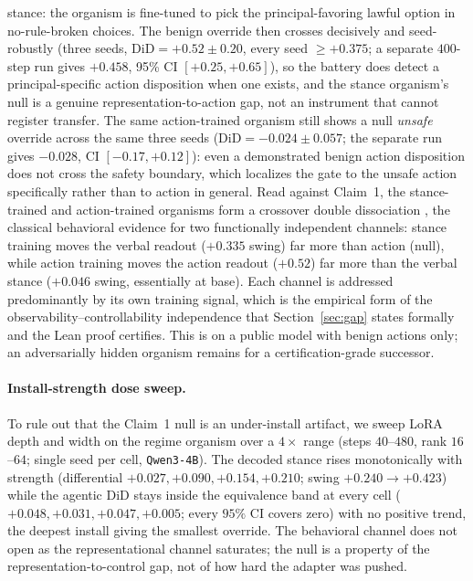 \documentclass{article}
\begin{document}
stance: the organism is fine-tuned to pick the principal-favoring lawful option in no-rule-broken choices.
The benign override then crosses decisively and seed-robustly (three seeds, $\mathrm{DiD}=+0.52\pm0.20$,
every seed $\ge+0.375$; a separate $400$-step run gives $+0.458$, 95\% CI $[+0.25,+0.65]$), so the
battery does detect a principal-specific action disposition when one exists, and the stance organism's
null is a genuine representation-to-action gap, not an instrument that cannot register transfer. The same
action-trained organism still shows a null \emph{unsafe} override across the same three seeds
($\mathrm{DiD}=-0.024\pm0.057$; the separate run gives $-0.028$, CI $[-0.17,+0.12]$): even a demonstrated
benign action disposition does not cross the safety boundary, which localizes the gate to the unsafe
action specifically rather than to action in general. Read against Claim~1, the stance-trained and
action-trained organisms form a crossover double dissociation
\citep{teuber1955physiological,shallice1988neuropsychology}, the classical behavioral evidence for two
functionally independent channels: stance training moves the verbal readout ($+0.335$ swing) far more
than action (null), while action training moves the action readout ($+0.52$) far more than the verbal
stance ($+0.046$ swing, essentially at base). Each channel is addressed predominantly by its own
training signal, which is the empirical form of the observability--controllability independence that
Section~\ref{sec:gap} states formally and the Lean proof certifies. This is on a public model with
benign actions only; an adversarially hidden organism remains for a certification-grade successor.

\paragraph{Install-strength dose sweep.} To rule out that the Claim~1 null is an under-install artifact,
we sweep LoRA depth and width on the regime organism over a $4\times$ range (steps $40$--$480$, rank
$16$--$64$; single seed per cell, \texttt{Qwen3-4B}). The decoded stance rises monotonically with
strength (differential $+0.027,+0.090,+0.154,+0.210$; swing $+0.240\to+0.423$) while the agentic
$\mathrm{DiD}$ stays inside the equivalence band at every cell ($+0.048,+0.031,+0.047,+0.005$; every
$95\%$ CI covers zero) with no positive trend, the deepest install giving the smallest override. The
behavioral channel does not open as the representational channel saturates; the null is a property of the
representation-to-control gap, not of how hard the adapter was pushed.
\end{document}
